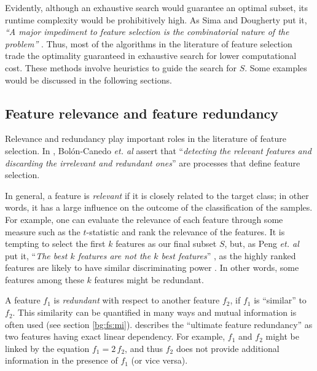 \documentclass[12pt, twoside, a4paper]{report}
\begin{document}
Evidently, although an exhaustive search would guarantee an optimal subset, its runtime complexity would be prohibitively high. As Sima and Dougherty put it, \textit{``A major impediment to feature selection is the combinatorial nature of the problem''} \cite{RefWorks:191}. Thus, most of the algorithms in the literature of feature selection trade the optimality guaranteed in exhaustive search for lower computational cost. These methods involve heuristics to guide the search for $S$. Some examples would be discussed in the following sections.

\subsection{Feature relevance and feature redundancy} \label{bg:fs:relevance}

Relevance and redundancy play important roles in the literature of feature selection. In \cite{RefWorks:163}, Bolón-Canedo \textit{et. al} assert that ``\textit{detecting the relevant features and discarding the irrelevant and redundant ones}'' are processes that define feature selection.

In general, a feature is \textit{relevant} if it is closely related to the target class; in other words, it has a large influence on the outcome of the classification of the samples. For example, one can evaluate the relevance of each feature through some measure such as the $t$-statistic and rank the relevance of the features. It is tempting to select the first $k$ features as our final subset $S$, but, as Peng \textit{et. al} put it, ``\textit{The best $k$ features are not the $k$ best features}'' \cite{RefWorks:182}, as the highly ranked features are likely to have similar discriminating power \cite{RefWorks:163}. In other words, some features among these $k$ features might be redundant.

A feature $f_1$ is \textit{redundant} with respect to another feature $f_2$, if $f_1$ is ``similar'' to $f_2$. This similarity can be quantified in many ways and mutual information is often used (see section \ref{bg:fs:mi}). \cite{RefWorks:187} describes the ``ultimate feature redundancy'' as two features having exact linear dependency. For example, $f_1$ and $f_2$ might be linked by the equation $f_1 = 2 \, f_2$, and thus $f_2$ does not provide additional information in the presence of $f_1$ (or vice versa).

\end{document}
